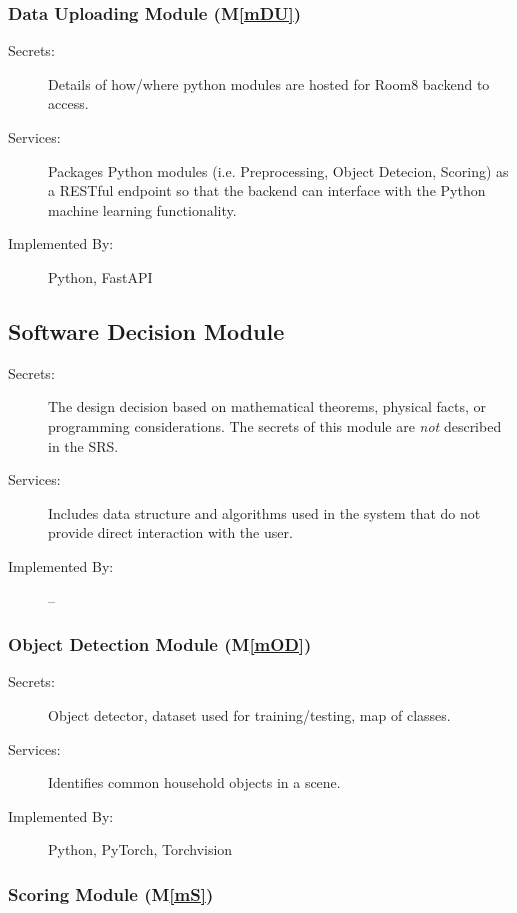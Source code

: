 \documentclass[12pt, titlepage]{article}
\newcommand{\mref}[1]{M\ref{#1}}
\begin{document}
\subsubsection{Data Uploading Module (\mref{mDU})}

\begin{description}
\item[Secrets:] Details of how/where python modules are hosted for Room8 backend to access.
\item[Services:] Packages Python modules (i.e. Preprocessing, Object Detecion, Scoring) as a RESTful endpoint so that the backend can interface with the Python machine learning functionality.
\item[Implemented By:] Python, FastAPI
\end{description}


\subsection{Software Decision Module}

\begin{description}
\item[Secrets:] The design decision based on mathematical theorems, physical
  facts, or programming considerations. The secrets of this module are
  \emph{not} described in the SRS.
\item[Services:] Includes data structure and algorithms used in the system that
  do not provide direct interaction with the user. 
\item[Implemented By:] --
\end{description}

\subsubsection{Object Detection Module (\mref{mOD})}

\begin{description}
\item[Secrets:]Object detector, dataset used for training/testing, map of classes. 
\item[Services:]Identifies common household objects in a scene.
\item[Implemented By:]Python, PyTorch, Torchvision
\end{description}

\subsubsection{Scoring Module (\mref{mS})}
\end{document}
